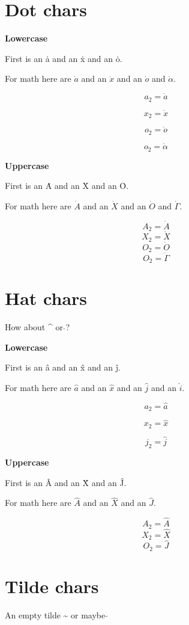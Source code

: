 ﻿\documentclass{article}
\begin{document}
\section{Dot chars}
\textbf{Lowercase}

First is an \.{a} and an \.{x} and an \.{o}.

For math here are $\dot{a}$ and an $\dot{x}$ and an $\dot{o}$ and $\dot{\alpha}$.

$$a_2=\dot{a}$$

$$x_2=\dot{x}$$

$$o_2=\dot{o}$$

$$o_2=\dot{\alpha}$$


\textbf{Uppercase}

First is an \.{A} and an \.{X} and an \.{O}.

For math here are $\dot{A}$ and an $\dot{X}$ and an $\dot{O}$ and $\dot{\Gamma}$.

$$A_2=\dot{A}$$
$$X_2=\dot{X}$$
$$O_2=\dot{O}$$
$$O_2=\dot{\Gamma}$$




\section{Hat chars}

How about \^{} or $\hat{}$? 

\textbf{Lowercase}

First is an \^{a} and an \^{x} and an \^{j}.

For math here are $\hat{a}$ and an $\hat{x}$ and an $\hat{j}$ and an $\hat{i}$.

$$a_2=\hat{a}$$

$$x_2=\hat{x}$$

$$j_2=\hat{j}$$

\textbf{Uppercase}

First is an \^{A} and an \^{X} and an \^{J}.

For math here are $\hat{A}$ and an $\hat{X}$ and an $\hat{J}$.

$$A_2=\hat{A}$$
$$X_2=\hat{X}$$
$$O_2=\hat{J}$$




\section{Tilde chars}

An empty tilde \~{} or maybe $\tilde{}$
\end{document}
